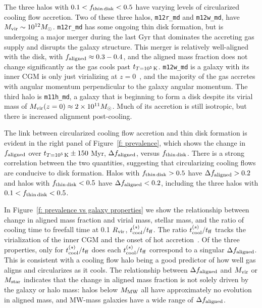 \documentclass[fleqn,usenatbib]{mnras}
\newcommand{\tcon}{t_{T=10^5\,{\rm K}}}
\begin{document}
The three halos with $0.1 < f_{\rm thin\,disk} < 0.5$ have varying levels of circularized cooling flow accretion.
Two of these three halos, \texttt{m12r\_md} and \texttt{m12w\_md}, have $M_{\rm vir} \sim 10^{12} M_\odot$.
\texttt{m12r\_md} has some ongoing thin disk formation, but is undergoing a major merger during the last Gyr that dominates the accreting gas supply and disrupts the galaxy structure.
This merger is relatively well-aligned with the disk, with $f_{\rm aligned} \approx 0.3-0.4$, and the aligned mass fraction does not change significantly as the gas cools past $\tcon$.
\texttt{m12w\_md} is a galaxy with its inner CGM is only just virializing at $z=0$~\citep{Yu2021}, and the majority of the gas accretes with angular momentum perpendicular to the galaxy angular momentum.
The third halo is \texttt{m11h\_md}, a galaxy that is beginning to form a disk despite its virial mass of $M_{\rm vir}(z=0) \approx 2 \times 10^{11} M_\odot$.
Much of its accretion is still isotropic, but there is increased alignment post-cooling.

The link between circularized cooling flow accretion and thin disk formation is evident in the right panel of Figure~\ref{f: prevalence}, which shows the change in $f_{\rm aligned}$ over $\tcon \pm 150$ Myr, $\Delta f_{\rm aligned}$, versus $f_{\rm thin\,disk}$.
There is a strong correlation between the two quantities, suggesting that circularizing cooling flows are conducive to disk formation. 
Halos with $f_{\rm thin\,disk} > 0.5$ have $\Delta f_{\rm aligned} > 0.2$ and halos with $f_{\rm thin\,disk} < 0.5$ have $\Delta f_{\rm aligned} < 0.2$, including the three halos with $0.1 < f_{\rm thin\,disk} < 0.5$.

In Figure~\ref{f: prevalence vs galaxy properties} we show the relationship between change in aligned mass fraction and virial mass, stellar mass, and the ratio of cooling time to freefall time at 0.1 $R_{\rm vir}$, $t_{\rm cool}^{(s)} / t_{\rm ff}$.
The ratio $t_{\rm cool}^{(s)} / t_{\rm ff}$ tracks the virialization of the inner CGM and the onset of hot accretion~\citep{Stern2020}.
Of the three properties, only for $t_{\rm cool}^{(s)} / t_{\rm ff}$ does each $t_{\rm cool}^{(s)} / t_{\rm ff}$ correspond to a singular $\Delta f_{\rm aligned}$.
This is consistent with a cooling flow halo being a good predictor of how well gas aligns and circularizes as it cools.
The relationship between $\Delta f_{\rm aligned}$ and $M_{\rm vir}$ or $M_{\rm star}$ indicates that the change in aligned mass fraction is not solely driven by the galaxy or halo mass:
halos below $M_{\rm MW}$ all have approximately no evolution in aligned mass, and MW-mass galaxies have a wide range of $\Delta f_{\rm aligned}$.
\end{document}
